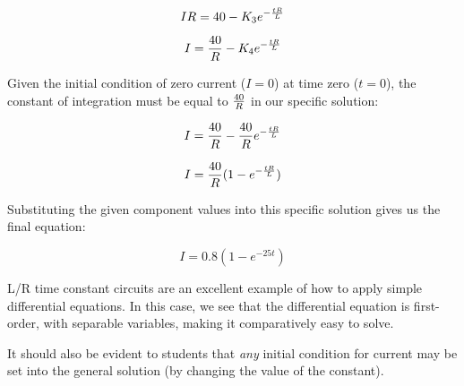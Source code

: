 $$IR = 40 - K_3e^{-{tR \over L}}$$

$$I = {40 \over R} - K_4e^{-{tR \over L}}$$

Given the initial condition of zero current ($I = 0$) at time zero ($t = 0$), the constant of integration must be equal to ${40 \over R}$ in our specific solution:

$$I = {40 \over R} - {40 \over R}e^{-{tR \over L}}$$

$$I = {40 \over R} (1 - e^{-{tR \over L}})$$

Substituting the given component values into this specific solution gives us the final equation:

$$I = 0.8(1 - e^{-25t})$$








L/R time constant circuits are an excellent example of how to apply simple differential equations.  In this case, we see that the differential equation is first-order, with separable variables, making it comparatively easy to solve.

It should also be evident to students that {\it any} initial condition for current may be set into the general solution (by changing the value of the constant).




